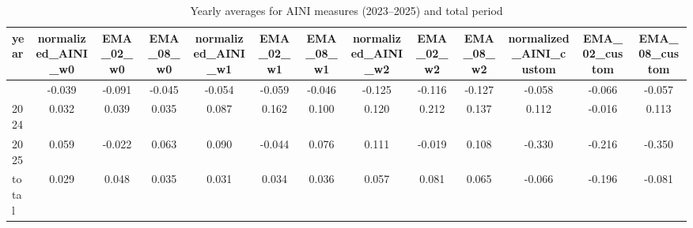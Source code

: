 \begin{table}[!htbp]
	\centering
	\caption{Yearly averages for AINI measures (2023--2025) and total period}
	\begin{adjustbox}{width=\textwidth}
		\begin{tabular}{lcccccccccccc}
			\toprule
			\addlinespace
			year & normalized\_AINI\_w0 & EMA\_02\_w0 & EMA\_08\_w0 & normalized\_AINI\_w1 & EMA\_02\_w1 & EMA\_08\_w1 & normalized\_AINI\_w2 & EMA\_02\_w2 & EMA\_08\_w2 & normalized\_AINI\_custom & EMA\_02\_custom & EMA\_08\_custom \\
			\midrule
			\addlinespace
			2023 & -0.039 & -0.091 & -0.045 & -0.054 & -0.059 & -0.046 & -0.125 & -0.116 & -0.127 & -0.058 & -0.066 & -0.057 \\
			2024 & 0.032 & 0.039 & 0.035 & 0.087 & 0.162 & 0.100 & 0.120 & 0.212 & 0.137 & 0.112 & -0.016 & 0.113 \\
			2025 & 0.059 & -0.022 & 0.063 & 0.090 & -0.044 & 0.076 & 0.111 & -0.019 & 0.108 & -0.330 & -0.216 & -0.350 \\
			total & 0.029 & 0.048 & 0.035 & 0.031 & 0.034 & 0.036 & 0.057 & 0.081 & 0.065 & -0.066 & -0.196 & -0.081 \\
			\bottomrule
		\end{tabular}
	\end{adjustbox}
\end{table}
